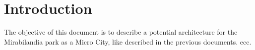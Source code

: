 \section*{Introduction}
\label{sec:introduction}

The objective of this document is to describe a potential architecture for the Mirabilandia park as a Micro City,
like described in the previous documents.
ecc.

